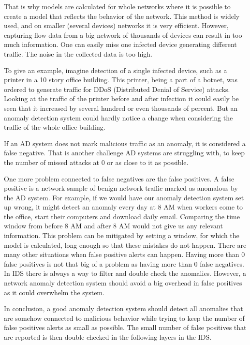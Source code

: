 \documentclass[thesis=B,english]{FITthesis}[2012/10/20]
\begin{document}
That is why models are calculated for whole networks where it is possible to create a model that reflects the behavior of the network.
This method is widely used, and on smaller (several devices) networks it is very efficient.
However, capturing flow data from a big network of thousands of devices can result in too much information.
One can easily miss one infected device generating different traffic.
The noise in the collected data is too high.

To give an example, imagine detection of a single infected device, such as a printer in a 10 story office building.
This printer, being a part of a botnet, was ordered to generate traffic for DDoS (Distributed Denial of Service) attacks.
Looking at the traffic of the printer before and after infection it could easily be seen that it increased by several hundred or even thousands of percent.
But an anomaly detection system could hardly notice a change when considering the traffic of the whole office building.

If an AD system does not mark malicious traffic as an anomaly, it is considered a false negative.
That is another challenge AD systems are struggling with, to keep the number of missed attacks at 0 or as close to it as possible.

One more problem connected to false negatives are the false positives.
A false positive is a network sample of benign network traffic marked as anomalous by the AD system.
For example, if we would have our anomaly detection system set up wrong, it might detect an anomaly every day at 8 AM when workers come to the office, start their computers and download daily email.
Comparing the time window from before 8 AM and after 8 AM would not give us any relevant information.
This problem can be mitigated by setting a window, for which the model is calculated, long enough so that these mistakes do not happen.
There are many other situations when false positive alerts can happen.
Having more than 0 false positives is not that big of a problem as having more than 0 false negatives.
In IDS there is always a way to filter and double check the anomalies.
However,  a network anomaly detection system should avoid a big overhead in false positives as it could overwhelm the system.

In conclusion, a good anomaly detection system should detect all anomalies that are somehow connected to malicious behavior while trying to keep the number of false positives alerts as small as possible.
The small number of false positives that are reported is then double-checked in the following layers in the IDS.
\end{document}
